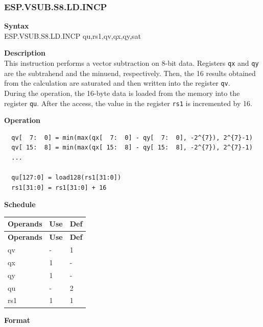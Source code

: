 \newpage
\subsubsection{ESP.VSUB.S8.LD.INCP}\label{instruction:ESPVSUBS8LDINCP}
\textbf{Syntax}\\
ESP.VSUB.S8.LD.INCP qu,rs1,qv,qx,qy,sat

\textbf{Description}\\
This instruction performs a vector subtraction on 8-bit data. Registers \lstinline{qx} and \lstinline{qy} are the subtrahend and the minuend, respectively. Then, the 16 results obtained from the calculation are saturated and then written into the register \lstinline{qv}. \\ During the operation, the 16-byte data is loaded from the memory into the register \lstinline{qu}. After the access, the value in the register \lstinline{rs1} is incremented by 16.

\textbf{Operation}\\
\begin{lstlisting}
  qv[  7:  0] = min(max(qx[  7:  0] - qy[  7:  0], -2^{7}), 2^{7}-1)
  qv[ 15:  8] = min(max(qx[ 15:  8] - qy[ 15:  8], -2^{7}), 2^{7}-1)
  ...

  qu[127:0] = load128(rs1[31:0])
  rs1[31:0] = rs1[31:0] + 16
\end{lstlisting}


\textbf{Schedule}\\
\begin{longtable}[c]{|l|l|l|}
    \hline
    \rowcolor{lightgray}
    \textbf{Operands} & \textbf{Use} & \textbf{Def} \\\hline
    \endfirsthead
    \hline
    \rowcolor{lightgray}
     \textbf{Operands} & \textbf{Use} & \textbf{Def} \\\hline
    \endhead
    \hline
    \endfoot

  qv & - & 1 \\\hline
    qx & 1 & - \\\hline
    qy & 1 & - \\\hline
    qu & - & 2 \\\hline
    rs1 & 1 & 1

\end{longtable}

\textbf{Format}\\

